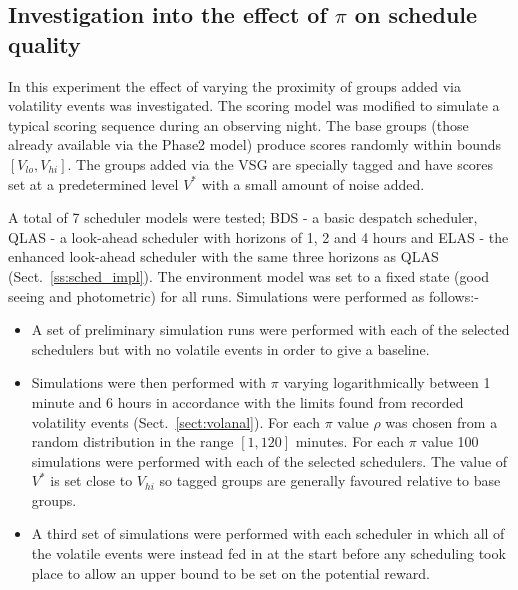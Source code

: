 \subsection{Investigation into the effect of $\pi$ on schedule quality}
In this experiment the effect of varying the proximity of groups added via volatility events was investigated. The scoring model was modified to simulate a typical scoring sequence during an observing night. The base groups (those already available via the Phase2 model) produce scores randomly within bounds $[V_{lo}, V_{hi}]$. The groups added via the VSG are specially tagged and have scores set at a predetermined level $V^*$ with a small amount of noise added. 

A total of 7 scheduler models were tested; BDS - a basic despatch scheduler, QLAS - a look-ahead scheduler with horizons of 1, 2 and 4 hours and ELAS - the enhanced look-ahead scheduler with the same three horizons as QLAS (Sect.~\ref{ss:sched_impl}). The environment model was set to a fixed state (good seeing and photometric) for all runs. Simulations were performed as follows:-

\begin{itemize}
\item A set of preliminary simulation runs were performed with each of the selected schedulers but with no volatile events in order to give a baseline.
\item Simulations were then performed with $\pi$ varying logarithmically between 1 minute and 6 hours  in accordance with the limits found from recorded volatility events (Sect.~\ref{sect:volanal}). For each $\pi$ value $\rho$ was chosen from a random distribution in the range $[1, 120]$ minutes. For each $\pi$ value 100 simulations were performed with each of the selected schedulers. The value of $V^*$ is set close to $V_{hi}$ so tagged groups are generally favoured relative to base groups.
\item A third set of simulations were performed with each scheduler in which all of the volatile events were instead fed in at the start before any scheduling took place to allow an upper bound to be set on the potential reward.
\end{itemize}

